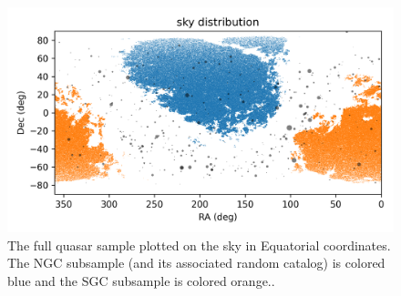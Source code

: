 \documentclass[modern]{aastex631}
\newlength{\figurewidth}
\begin{document}
\begin{figure}[t!]
  \begin{mdframed}
  \color{captiongray}
  \begin{center}
    \includegraphics[width=\figurewidth]{notebooks/radec.png}
  \end{center}
    \caption{The full quasar sample plotted on the sky in Equatorial coordinates.
    The NGC subsample (and its associated random catalog) is colored blue and the SGC subsample is colored orange.\label{fig:radec}.}
  \end{mdframed}
\end{figure}
\end{document}
